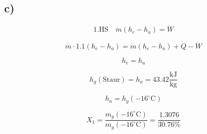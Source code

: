 

\subsection*{c)}

\[
1.\text{HS} \quad \dot{m}(h_e - h_a) = \dot{W}
\]

\[
\dot{m} \cdot 1.1(h_e - h_a) = \dot{m}(h_e - h_a) + \dot{Q} - \dot{W}
\]

\[
h_e = h_a
\]

\[
h_{g}(\text{Staur}) = h_a = 43.42 \frac{\text{kJ}}{\text{kg}}
\]

\[
h_a = h_{g}(-16^\circ \text{C})
\]

\[
X_1 = \frac{m_{g}(-16^\circ \text{C})}{m_{g}(-16^\circ \text{C})} = \frac{1.3076}{30.76\%}
\]